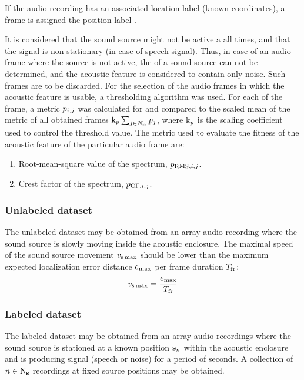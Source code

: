 \documentclass[applsci,article,submit,moreauthors,pdftex]{Definitions/mdpi}
\begin{document}
If the audio recording has an associated location label (known coordinates), a frame is assigned the position label \sposlabel{}.

It is considered that the sound source might not be active a all times, and that the signal is non-stationary (in case of speech signal). Thus, in case of an audio frame where the source is not active, the \doa{} of a sound source can not be determined, and the acoustic feature is considered to contain only noise. Such frames are to be discarded. For the selection of the audio frames in which the acoustic feature is usable, a thresholding algorithm was used. For each of the frame, a metric 
$ p{}_{i,j} $ 
was calculated for and compared to the scaled mean  of the metric of all obtained frames 
$ \mathrm{k}_{p} \sum_{j\in N_{\mathrm{fr}}} p{}_{j}  $, 
where $ \mathrm{k}_{p} $ is the scaling coefficient used to control the threshold value.
The metric used to evaluate the fitness of the acoustic feature of the particular audio frame are: 
\begin{enumerate}
	\item Root-mean-square  value of the \srpphat{} spectrum, $ p_{\mathrm{RMS},i,j} $.
	\item Crest factor of the \srpphat{} spectrum, $ p_{\mathrm{CF},i,j} $.
\end{enumerate}

\subsubsection{Unlabeled dataset}
The unlabeled dataset may be obtained from an array audio recording where the sound source is slowly moving inside the acoustic enclosure. The maximal speed of the sound source movement $ v_{\mathrm{s}\max} $ should be lower than the maximum expected localization error distance $ e_{\max} $ per frame duration $ T_{\mathrm{fr}} $:
\begin{equation}\label{eq:unlabeled_src_max_speed}
	v_{\mathrm{s}\max}  = \frac{e_{\max}}{T_{\mathrm{fr}}}
\end{equation} 
\subsubsection{Labeled dataset}
The labeled dataset may be obtained from an array audio recordings where the sound source is stationed at a known position $ \mathbf{s}_{n} $ within the acoustic enclosure and is producing signal (speech or noise) for a period of  seconds. A collection of $ n \in \mathrm{N}_{\mathbf{s}} $ recordings at fixed source positions may be obtained.
\end{document}
